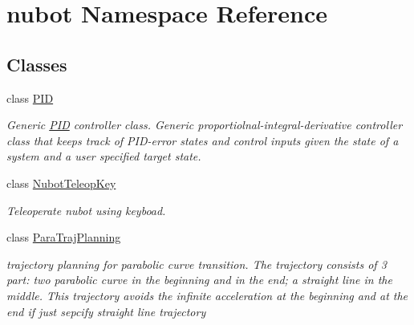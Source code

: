 \hypertarget{namespacenubot}{\section{nubot Namespace Reference}
\label{namespacenubot}
}
\subsection*{Classes}
\begin{DoxyCompactItemize}
\item 
class \hyperlink{classnubot_1_1PID}{P\-I\-D}
\begin{DoxyCompactList}\small\item\em Generic \hyperlink{classnubot_1_1PID}{P\-I\-D} controller class. Generic proportiolnal-\/integral-\/derivative controller class that keeps track of P\-I\-D-\/error states and control inputs given the state of a system and a user specified target state. \end{DoxyCompactList}\item 
class \hyperlink{classnubot_1_1NubotTeleopKey}{Nubot\-Teleop\-Key}
\begin{DoxyCompactList}\small\item\em Teleoperate nubot using keyboad. \end{DoxyCompactList}\item 
class \hyperlink{classnubot_1_1ParaTrajPlanning}{Para\-Traj\-Planning}
\begin{DoxyCompactList}\small\item\em trajectory planning for parabolic curve transition. The trajectory consists of 3 part\-: two parabolic curve in the beginning and in the end; a straight line in the middle. This trajectory avoids the infinite acceleration at the beginning and at the end if just sepcify straight line trajectory \end{DoxyCompactList}\end{DoxyCompactItemize}
